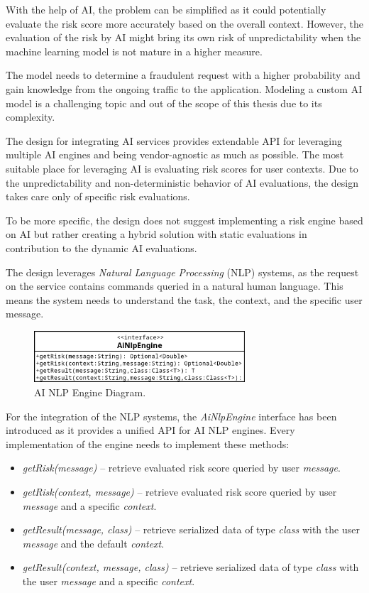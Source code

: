 With the help of AI, the problem can be simplified as it could potentially evaluate the risk score more accurately based on the overall context.
However, the evaluation of the risk by AI might bring its own risk of unpredictability when the machine learning model is not mature in a higher measure.

The model needs to determine a fraudulent request with a higher probability and gain knowledge from the ongoing traffic to the application.
Modeling a custom AI model is a challenging topic and out of the scope of this thesis due to its complexity.

The design for integrating AI services provides extendable API for leveraging multiple AI engines and being vendor-agnostic as much as possible.
The most suitable place for leveraging AI is evaluating risk scores for user contexts. 
Due to the unpredictability and non-deterministic behavior of AI evaluations, the design takes care only of specific risk evaluations.

To be more specific, the design does not suggest implementing a risk engine based on AI but rather creating a hybrid solution with static evaluations in contribution to the dynamic AI evaluations.

The design leverages \textit{Natural Language Processing} (NLP) systems, as the request on the service contains commands queried in a natural human language.
This means the system needs to understand the task, the context, and the specific user message.  

\begin{figure}[htbp]
  \centering
  \includegraphics[width=0.7\textwidth]{img/sections/5-design/ai-engine.png}
  \caption{AI NLP Engine Diagram.}
  \label{fig:ai-engine-diagram}
\end{figure}

\newpage
For the integration of the NLP systems, the \textit{AiNlpEngine} interface has been introduced as it provides a unified API for AI NLP engines.
Every implementation of the engine needs to implement these methods:

\begin{itemize}
    \item \textit{getRisk(message)} -- retrieve evaluated risk score queried by user \textit{message}. 
    \item \textit{getRisk(context, message)} -- retrieve evaluated risk score queried by user \textit{message} and a specific \textit{context}. 
    \item \textit{getResult(message, class)} -- retrieve serialized data of type \textit{class} with the user \textit{message} and the default \textit{context}.
    \item \textit{getResult(context, message, class)} -- retrieve serialized data of type \textit{class} with the user \textit{message} and a specific \textit{context}.
\end{itemize}

